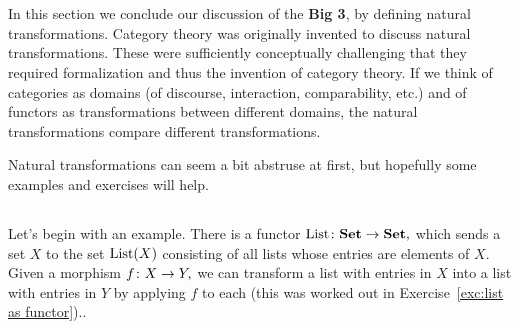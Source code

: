 \documentclass[CT4S-EN-RU]{subfiles}
\begin{document}
\section{}\label{sec:nat trans}

\begin{blockENG}
In this section we conclude our discussion of the {\bf Big 3}, by defining natural transformations. Category theory was originally invented to discuss natural transformations. These were sufficiently conceptually challenging that they required formalization and thus the invention of category theory. If we think of categories as domains (of discourse, interaction, comparability, etc.) and of functors as transformations between different domains, the natural transformations compare different transformations.
\end{blockENG}

\begin{blockRUS}
\end{blockRUS}

\begin{blockENG}
Natural transformations can seem a bit abstruse at first, but hopefully some examples and exercises will help.
\end{blockENG}

\begin{blockRUS}
\end{blockRUS}


\subsection{}

\begin{blockENG}
Let's begin with an example. There is a functor $\textnormal{List}\colon{\mathbf{Set}}\rightarrow{\mathbf{Set}},$ which sends a set $X$ to the set $\textnormal{List}(X)$ consisting of all lists whose entries are elements of $X.$ Given a morphism $f\colon X\rightarrow Y,$ we can transform a list with entries in $X$ into a list with entries in $Y$ by applying $f$ to each (this was worked out in Exercise~\ref{exc:list as functor}).. 
\end{blockENG}

\begin{blockRUS}
\end{blockRUS}
\end{document}
